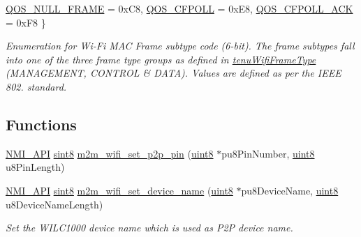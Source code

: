 \begin{DoxyCompactItemize}
\newline
\hyperlink{group__WlanEnums_ggaef9606d02acd4b3ce5497f5eb4176f2aa69adad58f221a480d5ab5c6697080dbf}{Q\+O\+S\+\_\+\+N\+U\+L\+L\+\_\+\+F\+R\+A\+ME} = 0x\+C8, 
\hyperlink{group__WlanEnums_ggaef9606d02acd4b3ce5497f5eb4176f2aac36e98a77c23d49bf4a9041e493f252d}{Q\+O\+S\+\_\+\+C\+F\+P\+O\+LL} = 0x\+E8, 
\hyperlink{group__WlanEnums_ggaef9606d02acd4b3ce5497f5eb4176f2aa3b3abf32075064d4f01049fd02a67c7b}{Q\+O\+S\+\_\+\+C\+F\+P\+O\+L\+L\+\_\+\+A\+CK} = 0x\+F8
 \}\begin{DoxyCompactList}\small\item\em Enumeration for Wi-\/\+Fi M\+AC Frame subtype code (6-\/bit). The frame subtypes fall into one of the three frame type groups as defined in \hyperlink{group__WlanEnums_ga593eb9b713b71fcc9cae6e81393b40d9}{tenu\+Wifi\+Frame\+Type} (M\+A\+N\+A\+G\+E\+M\+E\+NT, C\+O\+N\+T\+R\+OL \& D\+A\+TA). Values are defined as per the I\+E\+EE 802. standard. \end{DoxyCompactList}
\end{DoxyCompactItemize}
\subsection*{Functions}
\begin{DoxyCompactItemize}
\item 
\hyperlink{group__BSPDefine_gaecc0323d771e41ef81a76b5f12783e22}{N\+M\+I\+\_\+\+A\+PI} \hyperlink{group__DataT_gae35f10ffd0ac8dd2bc3e794da9bdfbc7}{sint8} \hyperlink{group__WlanEnums_gac93d56dc53ba0a5a02b669c800b7ae62}{m2m\+\_\+wifi\+\_\+set\+\_\+p2p\+\_\+pin} (\hyperlink{group__DataT_ga4df709a77647e870bbf1d955b8edc9a6}{uint8} $\ast$pu8\+Pin\+Number, \hyperlink{group__DataT_ga4df709a77647e870bbf1d955b8edc9a6}{uint8} u8\+Pin\+Length)
\end{DoxyCompactItemize}
\begin{DoxyCompactItemize}
\item 
\hyperlink{group__BSPDefine_gaecc0323d771e41ef81a76b5f12783e22}{N\+M\+I\+\_\+\+A\+PI} \hyperlink{group__DataT_gae35f10ffd0ac8dd2bc3e794da9bdfbc7}{sint8} \hyperlink{group__WlanEnums_ga629eca5105680e2807ffeb05181aa152}{m2m\+\_\+wifi\+\_\+set\+\_\+device\+\_\+name} (\hyperlink{group__DataT_ga4df709a77647e870bbf1d955b8edc9a6}{uint8} $\ast$pu8\+Device\+Name, \hyperlink{group__DataT_ga4df709a77647e870bbf1d955b8edc9a6}{uint8} u8\+Device\+Name\+Length)
\begin{DoxyCompactList}\small\item\em Set the W\+I\+L\+C1000 device name which is used as P2P device name. \end{DoxyCompactList}\end{DoxyCompactItemize}


